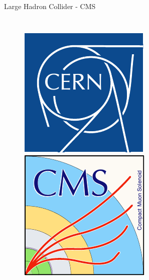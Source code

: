 \documentclass{beamer}
\begin{document}
\begin{frame}{Large Hadron Collider - CMS}
  \begin{columns}
      \begin{figure}
        \centering
        \includegraphics[width=.5\textwidth]{./Images/cern_logo.pdf}\\
        \vspace{1ex}
        \includegraphics[width=.5\textwidth]{./Images/cms_logo.pdf}

\end{figure}
\end{columns}
\end{frame}
\end{document}
